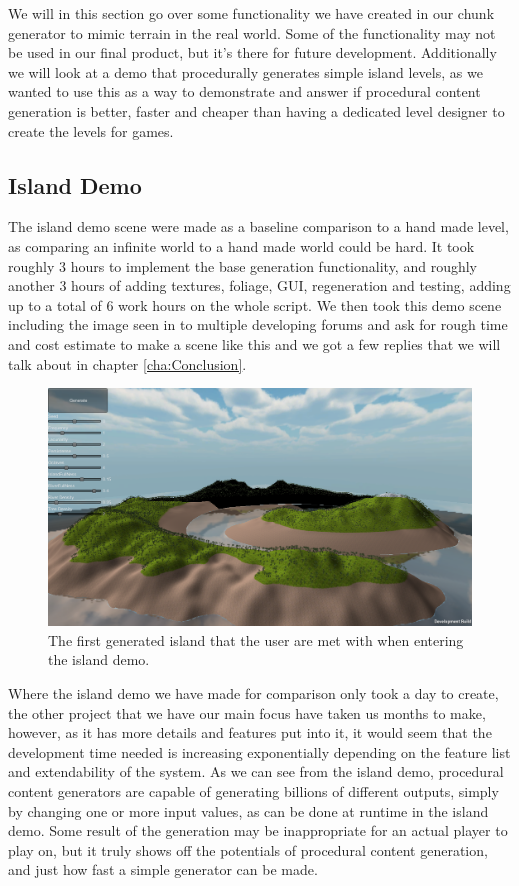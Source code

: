 We will in this section go over some functionality we have created in our chunk generator to mimic terrain in the real world. Some of the functionality may not be used in our final product, but it's there for future development. Additionally we will look at a demo that procedurally generates simple island levels, as we wanted to use this as a way to demonstrate and answer if procedural content generation is better, faster and cheaper than having a dedicated level designer to create the levels for games.


\subsection{Island Demo}
\label{IslandDemo}
The island demo scene were made as a baseline comparison to a hand made level, as comparing an infinite world to a hand made world could be hard. It took roughly 3 hours to implement the base generation functionality, and roughly another 3 hours of adding textures, foliage, GUI, regeneration and testing, adding up to a total of 6 work hours on the whole script. We then took this demo scene including the image seen in  to multiple developing forums and ask for rough time and cost estimate to make a scene like this and we got a few replies that we will talk about in chapter \ref{cha:Conclusion}.

\begin{figure}[H]
	\includegraphics[width=1\linewidth]{img/IslandDemo}
	\centering
	\caption{The first generated island that the user are met with when entering the island demo.}
	\label{fig:IslandDemo}
\end{figure}

Where the island demo we have made for comparison only took a day to create, the other project that we have our main focus have taken us months to make, however, as it has more details and features put into it, it would seem that the development time needed is increasing exponentially depending on the feature list and extendability of the system. As we can see from the island demo, procedural content generators are capable of generating billions of different outputs, simply by changing one or more input values, as can be done at runtime in the island demo. Some result of the generation may be inappropriate for an actual player to play on, but it truly shows off the potentials of procedural content generation, and just how fast a simple generator can be made.


